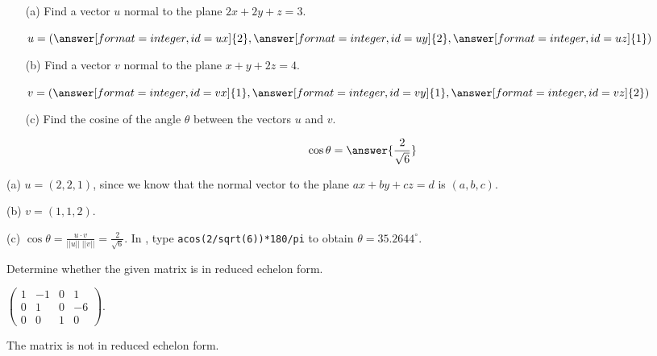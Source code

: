 \documentclass{ximera}
\begin{document}
\begin{exercise} \label{c2.2.9}
\begin{itemize}
\item[(a)] Find a vector $u$ normal to the plane $2x+2y+z=3$.
  \begin{prompt}
    \begin{validator}[(ux==uy) && (uy==2*uz) && (uy != 0)]
      \(
        u = \left( \answer[format=integer,id=ux]{2}, \answer[format=integer,id=uy]{2}, \answer[format=integer,id=uz]{1} \right)
      \)
    \end{validator}
  \end{prompt}
\item[(b)] Find a vector $v$ normal to the plane $x+y+2z=4$.
  \begin{prompt}
    \begin{validator}[(vx==vy) && (2*vy==vz) && (vy != 0)]
      \(
        v = \left( \answer[format=integer,id=vx]{1}, \answer[format=integer,id=vy]{1}, \answer[format=integer,id=vz]{2} \right)
      \)
    \end{validator}
  \end{prompt}
\item[(c)] Find the cosine of the angle $\theta$ between the vectors $u$ and $v$.
  \begin{prompt}
    \[
      \cos \theta = \answer{\frac{2}{\sqrt{6}}}
    \]
  \end{prompt}
\end{itemize}

\begin{solution}

(a) $u = (2,2,1)$, since we know that the normal vector to the plane
$ax + by + cz = d$ is $(a,b,c)$.

(b) $v = (1,1,2)$.

(c) $\cos\theta = \frac{u \cdot v}{||u||\;||v||} = \frac{2}{\sqrt{6}}$.
In \Matlabp, type {\tt acos(2/sqrt(6))*180/pi} to obtain $\theta =
35.2644^\circ$.

\end{solution}
\end{exercise}

\problemlabel

\noindent Determine whether the given matrix is in reduced echelon form.

\begin{exercise} \label{c2.3.6a}
$\left(\begin{array}{rrrr}
1 & -1 &  0 &   1   \\
0 &  1 &  0 &  -6    \\
         0 &  0 &  1 &   0   \end{array}\right)$.
     \begin{multipleChoice}
     \end{multipleChoice}

\begin{solution}
The matrix is not in reduced echelon form.


\end{solution}
\end{exercise}
\end{document}
